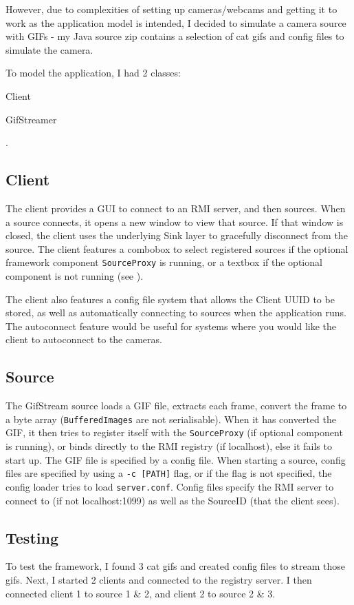 \documentclass[a4paper]{article}
\begin{document}
However, due to complexities of setting up cameras/webcams and getting it to work as the application model is intended, I decided to simulate a camera source with GIFs
- my Java source zip contains a selection of cat gifs and config files to simulate the camera.

To model the application, I had 2 classes:
\begin{enumerate*}
  \item Client
  \item GifStreamer
\end{enumerate*}.

\subsection{Client}
The client provides a GUI to connect to an RMI server, and then sources.
When a source connects, it opens a new window to view that source.
If that window is closed, the client uses the underlying Sink layer to gracefully disconnect from the source.
The client features a combobox to select registered sources if the optional framework component \texttt{SourceProxy} is running, or a textbox if the optional component is not running (see ).

The client also features a config file system that allows the Client UUID to be stored, as well as automatically connecting to sources when the application runs.
The autoconnect feature would be useful for systems where you would like the client to autoconnect to the cameras.

\subsection{Source}
The GifStream source loads a GIF file, extracts each frame, convert the frame to a byte array (\texttt{BufferedImages} are not serialisable).
When it has converted the GIF, it then tries to register itself with the \texttt{SourceProxy} (if optional component is running), or binds directly to the RMI registry (if localhost), else it fails to start up.
The GIF file is specified by a config file.
When starting a source, config files are specified by using a \texttt{-c [PATH]} flag, or if the flag is not specified, the config loader tries to load \texttt{server.conf}.
Config files specify the RMI server to connect to (if not localhost:1099) as well as the SourceID (that the client sees).

\subsection{Testing}
To test the framework, I found 3 cat gifs and created config files to stream those gifs.
Next, I started 2 clients and connected to the registry server.
I then connected client 1 to source 1 \& 2, and client 2 to source 2 \& 3.
\end{document}
